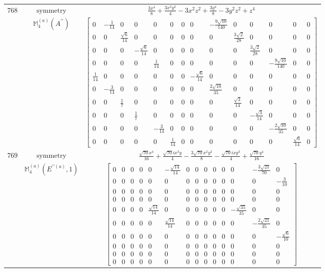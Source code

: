 \documentclass[fleqn,8pt,landscape]{jsarticle}
\begin{document}
\begin{longtable}{ccc}
$ 768 $ & $ \text{symmetry} $ & $ \frac{3 x^{4}}{8} + \frac{3 x^{2} y^{2}}{4} - 3 x^{2} z^{2} + \frac{3 y^{4}}{8} - 3 y^{2} z^{2} + z^{4} $ \\
$  $ & $ \mathbb{M}_{4}^{(a)}(A^{\prime\prime}) $ & $ \begin{bmatrix} 0 & - \frac{1}{14} & 0 & 0 & 0 & 0 & 0 & 0 & - \frac{9 \sqrt{10}}{140} & 0 & 0 & 0 & 0 & 0 \\ 0 & 0 & \frac{\sqrt{6}}{14} & 0 & 0 & 0 & 0 & 0 & 0 & \frac{3 \sqrt{2}}{28} & 0 & 0 & 0 & 0 \\ 0 & 0 & 0 & - \frac{\sqrt{6}}{14} & 0 & 0 & 0 & 0 & 0 & 0 & \frac{3 \sqrt{2}}{28} & 0 & 0 & 0 \\ 0 & 0 & 0 & 0 & \frac{1}{14} & 0 & 0 & 0 & 0 & 0 & 0 & - \frac{9 \sqrt{10}}{140} & 0 & 0 \\ \frac{1}{14} & 0 & 0 & 0 & 0 & 0 & 0 & - \frac{\sqrt{6}}{14} & 0 & 0 & 0 & 0 & 0 & 0 \\ 0 & - \frac{3}{14} & 0 & 0 & 0 & 0 & 0 & 0 & \frac{2 \sqrt{10}}{35} & 0 & 0 & 0 & 0 & 0 \\ 0 & 0 & \frac{1}{7} & 0 & 0 & 0 & 0 & 0 & 0 & \frac{\sqrt{3}}{14} & 0 & 0 & 0 & 0 \\ 0 & 0 & 0 & \frac{1}{7} & 0 & 0 & 0 & 0 & 0 & 0 & - \frac{\sqrt{3}}{14} & 0 & 0 & 0 \\ 0 & 0 & 0 & 0 & - \frac{3}{14} & 0 & 0 & 0 & 0 & 0 & 0 & - \frac{2 \sqrt{10}}{35} & 0 & 0 \\ 0 & 0 & 0 & 0 & 0 & \frac{1}{14} & 0 & 0 & 0 & 0 & 0 & 0 & \frac{\sqrt{6}}{14} & 0 \end{bmatrix} $ \\ \hline
$ 769 $ & $ \text{symmetry} $ & $ \frac{\sqrt{70} x^{4}}{16} + \frac{\sqrt{70} i x^{3} y}{4} - \frac{3 \sqrt{70} x^{2} y^{2}}{8} - \frac{\sqrt{70} i x y^{3}}{4} + \frac{\sqrt{70} y^{4}}{16} $ \\
$  $ & $ \mathbb{M}_{4}^{(a)}(E^{\prime\prime(a)},1) $ & $ \begin{bmatrix} 0 & 0 & 0 & 0 & 0 & - \frac{\sqrt{14}}{14} & 0 & 0 & 0 & 0 & 0 & 0 & - \frac{3 \sqrt{21}}{70} & 0 \\ 0 & 0 & 0 & 0 & 0 & 0 & 0 & 0 & 0 & 0 & 0 & 0 & 0 & - \frac{3}{10} \\ 0 & 0 & 0 & 0 & 0 & 0 & 0 & 0 & 0 & 0 & 0 & 0 & 0 & 0 \\ 0 & 0 & 0 & 0 & 0 & 0 & 0 & 0 & 0 & 0 & 0 & 0 & 0 & 0 \\ 0 & 0 & 0 & 0 & \frac{\sqrt{14}}{14} & 0 & 0 & 0 & 0 & 0 & 0 & - \frac{\sqrt{35}}{35} & 0 & 0 \\ 0 & 0 & 0 & 0 & 0 & \frac{\sqrt{14}}{14} & 0 & 0 & 0 & 0 & 0 & 0 & - \frac{2 \sqrt{21}}{35} & 0 \\ 0 & 0 & 0 & 0 & 0 & 0 & 0 & 0 & 0 & 0 & 0 & 0 & 0 & - \frac{\sqrt{6}}{10} \\ 0 & 0 & 0 & 0 & 0 & 0 & 0 & 0 & 0 & 0 & 0 & 0 & 0 & 0 \\ 0 & 0 & 0 & 0 & 0 & 0 & 0 & 0 & 0 & 0 & 0 & 0 & 0 & 0 \\ 0 & 0 & 0 & 0 & 0 & 0 & 0 & 0 & 0 & 0 & 0 & 0 & 0 & 0 \end{bmatrix} $ \\ \hline

\end{longtable}
\end{document}
